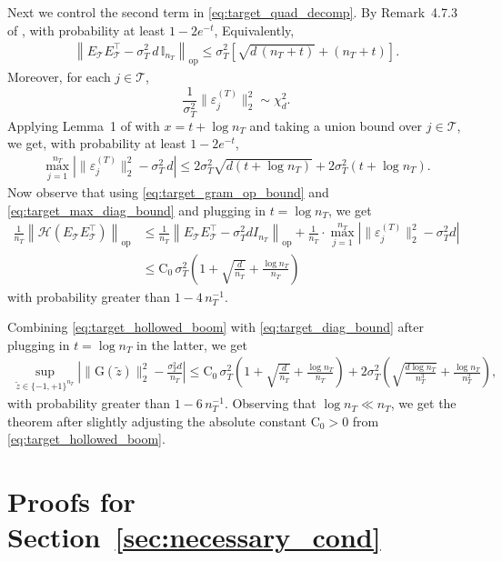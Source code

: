 \documentclass[10pt]{article}
\newcommand{\op}{\mathrm{op}}
\newcommand{\Id}{\mathbb I}
\newcommand{\wt}{\widetilde}
\newcommand{\calT}{\mathcal T}
\newcommand{\trg}{T}
\newcommand{\nT}{n_{\trg}}
\newcommand{\sigmaT}{\sigma_{\trg}}
\begin{document}
Next we control the second term in \eqref{eq:target_quad_decomp}. By Remark~4.7.3 of \citet{vershynin2025high}, with probability at least $1-2e^{-t}$,
Equivalently,
\begin{align}
\left\|E_\calT E_\calT^\top-\sigmaT^2\,d\,\Id_{\nT}\right\|_{\op}\le\sigmaT^2
\left[\sqrt{d\,(\nT+t)}+(\nT+t)\right].
\label{eq:target_gram_op_bound}
\end{align}
Moreover, for each $j\in\calT$,
\[
    \frac{1}{\sigmaT^2}
    \|\varepsilon_j^{(\trg)}\|_2^2
    \sim \chi^2_d .
\]
Applying Lemma~1 of \cite{laurent2000adaptive} with $x=t+\log\nT$ and taking a union bound over $j\in\calT$, we get, with probability at least $1-2e^{-t}$,
\begin{align}
\max_{j=1}^{\nT}\left|\|\varepsilon_j^{(\trg)}\|_2^2-\sigmaT^2\,d\right|
\le2\sigmaT^2\sqrt{d(t+\log\nT)}+2\sigmaT^2(t+\log\nT).
\label{eq:target_max_diag_bound}
\end{align}
Now observe that using \eqref{eq:target_gram_op_bound} and \eqref{eq:target_max_diag_bound} and plugging in $t=\log \nT$, we get
\begin{align}
\label{eq:target_hollowed_boom}
\frac{1}{\nT}\left\|\mathcal H\!\left(E_\calT E_\calT^\top\right)\right\|_{\op}
&\le\frac{1}{\nT}\left\|E_\calT E_\calT^\top-\sigmaT^2dI_{\nT}\right\|_{\op} +
\frac{1}{\nT}\cdot\max_{j=1}^{\nT}\left|\|\varepsilon_j^{(\trg)}\|_2^2-\sigmaT^2d\right|\\
& \le \mathrm C_0\,\sigmaT^2\left(1+\sqrt{\frac{d}{\nT}}+\frac{\log \nT}{\nT}\right)
\end{align}
with probability greater than $1-4\,\nT^{-1}$.

Combining \eqref{eq:target_hollowed_boom} with \eqref{eq:target_diag_bound} after plugging in $t=\log \nT$ in the latter, we get
\begin{align}
    \sup_{\wt z\in\{-1,+1\}^{\nT}}\left|\|\mathrm G(\wt z)\|_2^2-\frac{\sigmaT^2d}{\nT}\right| \le\mathrm C_0\,\sigmaT^2\left(1+\sqrt{\frac{d}{\nT}}+\frac{\log \nT}{\nT}\right)+2\sigmaT^2\left(\sqrt{\frac{d\log \nT}{\nT^3}}+\frac{\log \nT}{\nT^2}\right),
\end{align}
with probability greater than $1-6\,\nT^{-1}$. Observing that $\log \nT \ll \nT$, we get the theorem after slightly adjusting the absolute constant $\mathrm C_0>0$ from \eqref{eq:target_hollowed_boom}.


\section{Proofs for Section~\ref{sec:necessary_cond}}
\label{app:proof-sec3}
\end{document}
